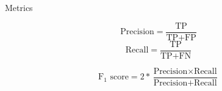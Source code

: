 	\begin{frame}{Metrics}
	
		\begin{multicols}{2}
  			\begin{equation*}
    			\text{Precision} = \frac{\text{TP}}{\text{TP} + \text{FP}}
  			\end{equation*}\break
  			\begin{equation*}
    			\text{Recall} = \frac{\text{TP}}{\text{TP} + \text{FN}}
  			\end{equation*}
		\end{multicols}

		$$
			\text{F$_{1}$ score} = 2 * \frac{\text{Precision} \times \text{Recall}}{\text{Precision} + \text{Recall}}
		$$
		
		\note{
			\dots
		}
	\end{frame}